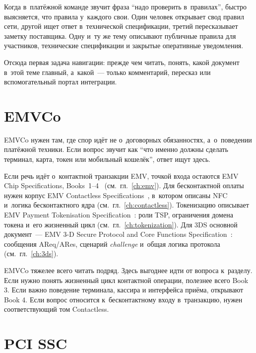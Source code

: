 
\label{ch:primary-sources}
Когда в~платёжной команде звучит фраза \enquote{надо проверить
в~правилах}, быстро выясняется, что правила у~каждого свои. Один человек
открывает свод правил сети, другой ищет ответ
в~технической спецификации, третий пересказывает заметку поставщика.
Одну и~ту же тему описывают публичные правила для участников, технические
спецификации и закрытые оперативные уведомления.

Отсюда первая задача навигации: прежде чем читать, понять, какой документ
в~этой теме главный, а~какой~--- только комментарий, пересказ или
вспомогательный портал интеграции.

\section*{EMVCo}\label{sec:ps-emvco}

EMVCo нужен там, где спор идёт не о~договорных обязанностях, а~о~поведении
платёжной техники. Если вопрос звучит как \enquote{что именно должны сделать
терминал, карта, токен или мобильный кошелёк}, ответ ищут здесь.

Если речь идёт о~контактной транзакции EMV, точкой входа остаются EMV Chip
Specifications, Books~1--4~\cite{emvco-specs} (см.~гл.~\ref{ch:emv}). Для
бесконтактной оплаты нужен корпус EMV Contactless
Specifications~\cite{emvco-contactless-chip}, в~котором описаны NFC и~логика
бесконтактного ядра (см.~гл.~\ref{ch:contactless}). Токенизацию
описывает EMV Payment Tokenisation
Specification~\cite{emvco-payment-tokenisation}: роли TSP, ограничения домена
токена и~его жизненный цикл (см.~гл.~\ref{ch:tokenization}). Для 3DS основной
документ~--- EMV 3-D Secure Protocol and Core Functions
Specification~\cite{emvco-3ds}: сообщения AReq/ARes, сценарий
\textit{challenge} и~общая логика протокола (см.~гл.~\ref{ch:3ds}).

EMVCo тяжелее всего читать подряд. Здесь выгоднее идти от вопроса к~разделу.
Если нужно понять жизненный цикл контактной операции, полезнее всего Book 3.
Если важно поведение терминала, кассира и интерфейса приёма, открывают
Book 4. Если вопрос относится к~бесконтактному входу в~транзакцию, нужен
соответствующий том Contactless.

\section*{PCI SSC}\label{sec:ps-pci}


